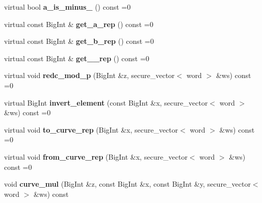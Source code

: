\begin{DoxyCompactItemize}
\mbox{\label{class_botan_1_1_curve_g_fp___repr_ae59415242ef5bb3a04c005eaea4f5403}} 
virtual bool {\bfseries a\+\_\+is\+\_\+minus\+\_} () const =0
\item 
\mbox{\label{class_botan_1_1_curve_g_fp___repr_a05853db26ac353ac8512e1f68d17ebc6}} 
virtual const Big\+Int \& {\bfseries get\+\_\+a\+\_\+rep} () const =0
\item 
\mbox{\label{class_botan_1_1_curve_g_fp___repr_a90a18c7df51b8e1d671889728f60036f}} 
virtual const Big\+Int \& {\bfseries get\+\_\+b\+\_\+rep} () const =0
\item 
\mbox{\label{class_botan_1_1_curve_g_fp___repr_a582099c25a5c10b35a4baaf3090d5765}} 
virtual const Big\+Int \& {\bfseries get\+\_\+\_\+rep} () const =0
\item 
\mbox{\label{class_botan_1_1_curve_g_fp___repr_ae4617f2595b9f9f0c606fcf440329c42}} 
virtual void {\bfseries redc\+\_\+mod\+\_\+p} (Big\+Int \&z, secure\+\_\+vector$<$ word $>$ \&ws) const =0
\item 
\mbox{\label{class_botan_1_1_curve_g_fp___repr_a557e2bb88ec79b425d12f2352d8ba652}} 
virtual Big\+Int {\bfseries invert\+\_\+element} (const Big\+Int \&x, secure\+\_\+vector$<$ word $>$ \&ws) const =0
\item 
\mbox{\label{class_botan_1_1_curve_g_fp___repr_a6868ab3f46a72c966dd397cbbb7b98a9}} 
virtual void {\bfseries to\+\_\+curve\+\_\+rep} (Big\+Int \&x, secure\+\_\+vector$<$ word $>$ \&ws) const =0
\item 
\mbox{\label{class_botan_1_1_curve_g_fp___repr_aa1e9b8706dd63969729a8b928b098021}} 
virtual void {\bfseries from\+\_\+curve\+\_\+rep} (Big\+Int \&x, secure\+\_\+vector$<$ word $>$ \&ws) const =0
\item 
\mbox{\label{class_botan_1_1_curve_g_fp___repr_a1429c4a81c4772873b65b64eb48b9b8e}} 
void {\bfseries curve\+\_\+mul} (Big\+Int \&z, const Big\+Int \&x, const Big\+Int \&y, secure\+\_\+vector$<$ word $>$ \&ws) const

\end{DoxyCompactItemize}

